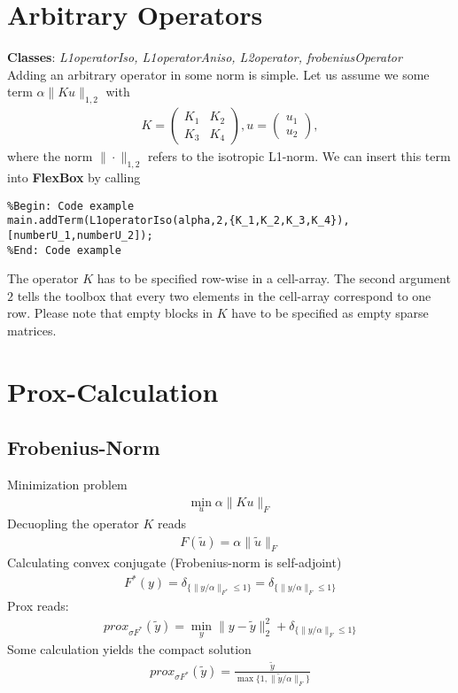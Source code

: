 \documentclass[final,leqno,onefignum,onetabnum]{article}
\newcommand{\1}[1]{\mathds{1}_{#1}}
\begin{document}
\section{Arbitrary Operators}
\textbf{Classes}: \textit{L1operatorIso, L1operatorAniso, L2operator, frobeniusOperator}\\
Adding an arbitrary operator in some norm is simple. Let us assume we some term $\alpha \|Ku\|_{1,2}$ with 
\begin{align*}
	K=\begin{pmatrix}K_1&K_2\\K_3&K_4\end{pmatrix}, u=\begin{pmatrix}u_1\\u_2\end{pmatrix},
\end{align*}
where the norm $\|\cdot\|_{1,2}$ refers to the isotropic L1-norm. We can insert this term into \textbf{FlexBox} by calling
\begin{lstlisting} 
%Begin: Code example
main.addTerm(L1operatorIso(alpha,2,{K_1,K_2,K_3,K_4}),[numberU_1,numberU_2]);
%End: Code example
\end{lstlisting}
The operator $K$ has to be specified row-wise in a cell-array. The second argument $2$ tells the toolbox that every two elements in the cell-array correspond to one row. Please note that empty blocks in $K$ have to be specified as empty sparse matrices.

\section{Prox-Calculation}

\subsection{Frobenius-Norm}
Minimization problem
\begin{align}
	\min_u \alpha\|Ku\|_F	
\end{align}
Decuopling the operator $K$ reads
\begin{align}
	F(\tilde{u}) = \alpha\|\tilde{u}\|_F
\end{align}
Calculating convex conjugate (Frobenius-norm is self-adjoint)
\begin{align}
	F^*(y) = \delta_{\{ \|y/\alpha\|_{F^*} \leq 1 \}} = \delta_{\{ \|y/\alpha\|_{F} \leq 1 \}}
\end{align}
Prox reads:
\begin{align}
	prox_{\sigma F^*}(\tilde{y}) = \min_y \|y-\tilde{y}\|_2^2 + \delta_{\{ \|y/\alpha\|_{F} \leq 1 \}}	
\end{align}
Some calculation yields the compact solution
\begin{align}
	prox_{\sigma F^*}(\tilde{y}) = \frac{\tilde{y}}{\max\{1, \|\tilde{y}/\alpha\|_{F} \}}
\end{align}
\end{document}
